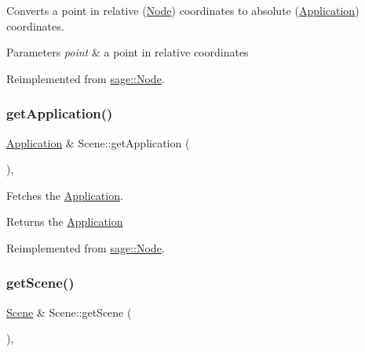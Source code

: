 Converts a point in relative (\mbox{\hyperlink{classsage_1_1Node}{Node}}) coordinates to absolute (\mbox{\hyperlink{classsage_1_1Application}{Application}}) coordinates. 


\begin{DoxyParams}{Parameters}
{\em point} & a point in relative coordinates \\
\hline
\end{DoxyParams}


Reimplemented from \mbox{\hyperlink{classsage_1_1Node_a708c034b5b9d316265309a3a46811a06}{sage\+::\+Node}}.

\mbox{\label{classsage_1_1Scene_ae81f9c71c6a8e6e57b1759018a3e0a3c}} 
\subsubsection{\texorpdfstring{getApplication()}{getApplication()}}
{\footnotesize\ttfamily \mbox{\hyperlink{classsage_1_1Application}{Application}} \& Scene\+::get\+Application (\begin{DoxyParamCaption}{ }\end{DoxyParamCaption})\hspace{0.3cm}{\ttfamily [override]}, {\ttfamily [virtual]}}



Fetches the \mbox{\hyperlink{classsage_1_1Application}{Application}}. 

\begin{DoxyReturn}{Returns}
the \mbox{\hyperlink{classsage_1_1Application}{Application}} 
\end{DoxyReturn}


Reimplemented from \mbox{\hyperlink{classsage_1_1Node_a94ddcfcf924b47e46cda2665328f6595}{sage\+::\+Node}}.

\mbox{\label{classsage_1_1Scene_a2fec0ba5c1b495c89dea471f5a175f2e}} 
\subsubsection{\texorpdfstring{getScene()}{getScene()}}
{\footnotesize\ttfamily \mbox{\hyperlink{classsage_1_1Scene}{Scene}} \& Scene\+::get\+Scene (\begin{DoxyParamCaption}{ }\end{DoxyParamCaption})\hspace{0.3cm}{\ttfamily [override]}, {\ttfamily [virtual]}}



